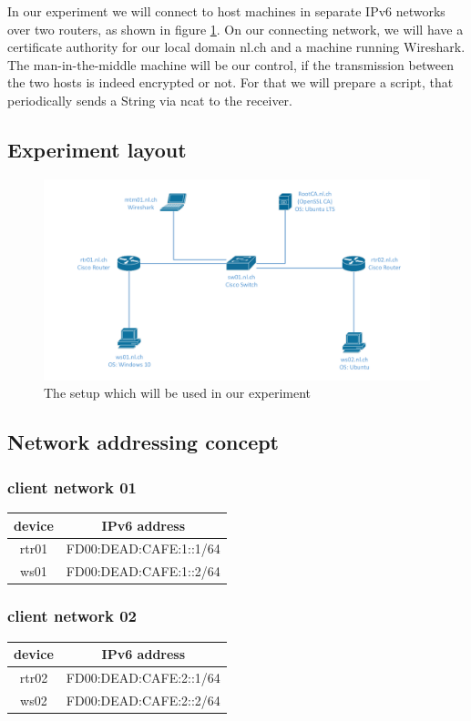 \documentclass[a4paper]{report}
\begin{document}
In our experiment we will connect to host machines in separate IPv6 networks over two routers, as shown in figure \ref{fig:exp_layout}. On our connecting network, we will have a certificate authority for our local domain nl.ch and a machine running Wireshark. The man-in-the-middle machine will be our control, if the transmission between the two hosts is indeed encrypted or not. For that we will prepare a script, that periodically sends a String via ncat to the receiver.

\subsection{Experiment layout}
\label{ssec:ExpLayout}

\begin{figure}[htb]
	\includegraphics[keepaspectratio, width = \linewidth]{experiment_layout}
	\caption{The setup which will be used in our experiment}
	\label{fig:exp_layout}
\end{figure}

\subsection{Network addressing concept}
\subsubsection{client network 01}
\begin{tabular}{|c|c|}
	\hline 
	\textbf{device} & \textbf{IPv6 address} \\ 
	\hline 
	rtr01 & FD00:DEAD:CAFE:1::1/64 \\ 
	\hline 
	ws01 & FD00:DEAD:CAFE:1::2/64 \\ 
	\hline 
\end{tabular} 

\subsubsection{client network 02}
\begin{tabular}{|c|c|}
	\hline 
	\textbf{device} & \textbf{IPv6 address} \\ 
	\hline 
	rtr02 & FD00:DEAD:CAFE:2::1/64 \\ 
	\hline 
	ws02 & FD00:DEAD:CAFE:2::2/64 \\ 
	\hline 
\end{tabular} 
\end{document}
